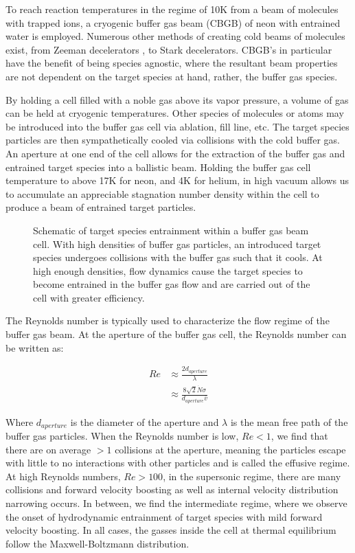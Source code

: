 To reach reaction temperatures in the regime of 10K from a beam of molecules with trapped ions, a cryogenic buffer gas beam (CBGB) of neon with entrained water is employed. Numerous other methods of creating cold beams of molecules exist, from Zeeman decelerators \cite{Narevicius2008}, to Stark decelerators. CBGB's in particular have the benefit of being species agnostic, where the resultant beam properties are not dependent on the target species at hand, rather, the buffer gas species. 

By holding a cell filled with a noble gas above its vapor pressure, a volume of gas can be held at cryogenic temperatures. Other species of molecules or atoms may be introduced into the buffer gas cell via ablation, fill line, etc. The target species particles are then sympathetically cooled via collisions with the cold buffer gas. An aperture at one end of the cell allows for the extraction of the buffer gas and entrained target species into a ballistic beam. Holding the buffer gas cell temperature to above 17K for neon, and 4K for helium, in high vacuum allows us to accumulate an appreciable stagnation number density within the cell to produce a beam of entrained target particles. 

\begin{figure}
	\centering
	\caption{Schematic of target species entrainment within a buffer gas beam cell. With high densities of buffer gas particles, an introduced target species undergoes collisions with the buffer gas such that it cools. At high enough densities, flow dynamics cause the target species to become entrained in the buffer gas flow and are carried out of the cell with greater efficiency.}
\end{figure}

The Reynolds number is typically used to characterize the flow regime of the buffer gas beam. At the aperture of the buffer gas cell, the Reynolds number can be written as:

\begin{align}
	Re & \approx \frac{2 d_{aperture}}{\lambda} \nonumber \\
	& \approx \frac{8\sqrt{2} \dot{N} \sigma}{d_{aperture} \bar{v}} \label{eq: reynolds}
\end{align}

Where $d_{aperture}$ is the diameter of the aperture and $\lambda$ is the mean free path of the buffer gas particles.\cite{Hutzler2012} When the Reynolds number is low, $Re<1$, we find that there are on average $>1$ collisions at the aperture, meaning the particles escape with little to no interactions with other particles and is called the effusive regime. At high Reynolds numbers, $Re>100$, in the supersonic regime, there are many collisions and forward velocity boosting as well as internal velocity distribution narrowing occurs. In between, we find the intermediate regime, where we observe the onset of hydrodynamic entrainment of target species with mild forward velocity boosting. In all cases, the gasses inside the cell at thermal equilibrium follow the Maxwell-Boltzmann distribution.

